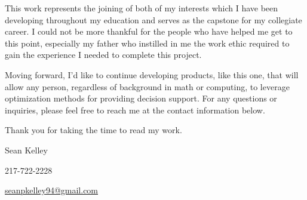 \documentclass[letterpaper,10pt,english]{sphinxmanual}
\begin{document}
This work represents the joining of both of my interests which I have been
developing throughout my education and serves as the capstone for my
collegiate career. I could not be more thankful for the people who have
helped me get to this point, especially my father who instilled in me the
work ethic required to gain the experience I needed to complete this project.

Moving forward, I'd like to continue developing products, like this one, that
will allow any person, regardless of background in math or computing, to
leverage optimization methods for providing decision support. For any
questions or inquiries, please feel free to reach me at the contact
information below.

Thank you for taking the time to read my work.

Sean Kelley

217-722-2228

\href{mailto:seanpkelley94@gmail.com}{seanpkelley94@gmail.com}



\renewcommand{\indexname}{Index}
\printindex
\end{document}
